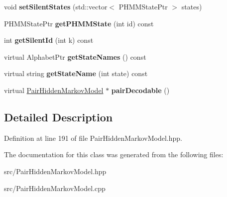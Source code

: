 \begin{DoxyCompactItemize}
void {\bfseries set\+Silent\+States} (std\+::vector$<$ P\+H\+M\+M\+State\+Ptr $>$ states)
\item 
\mbox{\label{classtops_1_1PairHiddenMarkovModel_ac10fcb4e22c0479d61863c334b928670}} 
P\+H\+M\+M\+State\+Ptr {\bfseries get\+P\+H\+M\+M\+State} (int id) const
\item 
\mbox{\label{classtops_1_1PairHiddenMarkovModel_adf3b283d13cbbb93214f91ef73784841}} 
int {\bfseries get\+Silent\+Id} (int k) const
\item 
\mbox{\label{classtops_1_1PairHiddenMarkovModel_afab7c8fd54830684d479585d86f6f09c}} 
virtual Alphabet\+Ptr {\bfseries get\+State\+Names} () const
\item 
\mbox{\label{classtops_1_1PairHiddenMarkovModel_ac0247e6339a4c34e0549a9721bb78569}} 
virtual string {\bfseries get\+State\+Name} (int state) const
\item 
\mbox{\label{classtops_1_1PairHiddenMarkovModel_a9726a190ade555b571f5d166da8578d6}} 
virtual \hyperlink{classtops_1_1PairHiddenMarkovModel}{Pair\+Hidden\+Markov\+Model} $\ast$ {\bfseries pair\+Decodable} ()
\end{DoxyCompactItemize}


\subsection{Detailed Description}


Definition at line 191 of file Pair\+Hidden\+Markov\+Model.\+hpp.



The documentation for this class was generated from the following files\+:\begin{DoxyCompactItemize}
\item 
src/Pair\+Hidden\+Markov\+Model.\+hpp\item 
src/Pair\+Hidden\+Markov\+Model.\+cpp\end{DoxyCompactItemize}
